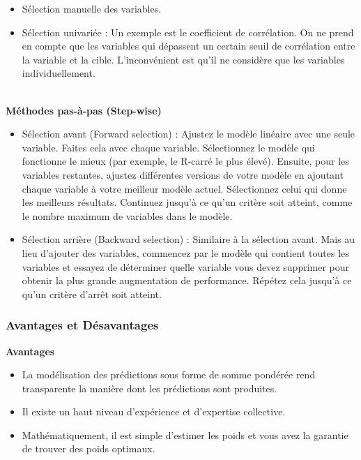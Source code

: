 \begin{itemize}
    \item Sélection manuelle des variables.
    \item Sélection univariée : Un exemple est le coefficient de corrélation. On ne prend en compte que les variables qui dépassent un certain seuil de corrélation entre la variable et la cible. L'inconvénient est qu'il ne considère que les variables individuellement.
\end{itemize}
\\
\textbf{Méthodes pas-à-pas (Step-wise)}
\\
\begin{itemize}
    \item Sélection avant (Forward selection) : Ajustez le modèle linéaire avec une seule variable. Faites cela avec chaque variable. Sélectionnez le modèle qui fonctionne le mieux (par exemple, le R-carré le plus élevé). Ensuite, pour les variables restantes, ajustez différentes versions de votre modèle en ajoutant chaque variable à votre meilleur modèle actuel. Sélectionnez celui qui donne les meilleurs résultats. Continuez jusqu'à ce qu'un critère soit atteint, comme le nombre maximum de variables dans le modèle.
    \item Sélection arrière (Backward selection) : Similaire à la sélection avant. Mais au lieu d'ajouter des variables, commencez par le modèle qui contient toutes les variables et essayez de déterminer quelle variable vous devez supprimer pour obtenir la plus grande augmentation de performance. Répétez cela jusqu'à ce qu'un critère d'arrêt soit atteint.
\end{itemize}

\subsubsection{Avantages et Désavantages}

\textbf{Avantages}

\begin{itemize}
    \item La modélisation des prédictions sous forme de somme pondérée rend transparente la manière dont les prédictions sont produites.
    \item Il existe un haut niveau d'expérience et d'expertise collective.
    \item Mathématiquement, il est simple d'estimer les poids et vous avez la garantie de trouver des poids optimaux.
\end{itemize}

